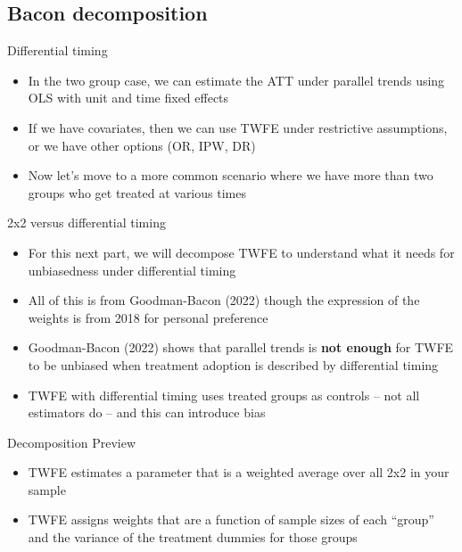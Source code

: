 \documentclass{beamer}
\begin{document}
\subsection{Bacon decomposition}






\begin{frame}{Differential timing}

\begin{itemize}
\item In the two group case, we can estimate the ATT under parallel trends using OLS with unit and time fixed effects
\item If we have covariates, then we can use TWFE under restrictive assumptions, or we have other options (OR, IPW, DR)
\item Now let's move to a more common scenario where we have more than two groups who get treated at various times
\end{itemize}

\end{frame}

\begin{frame}{2x2 versus differential timing}

\begin{itemize}
	\item For this next part, we will decompose TWFE to understand what it needs for unbiasedness under differential timing
	\item All of this is from Goodman-Bacon (2022) though the expression of the weights is from 2018 for personal preference
	\item Goodman-Bacon (2022) shows that parallel trends is \textbf{not enough} for TWFE to be unbiased when treatment adoption is described by differential timing
	\item TWFE with differential timing uses treated groups as controls -- not all estimators do -- and this can introduce bias
\end{itemize}

\end{frame}



\begin{frame}{Decomposition Preview}

\begin{itemize}
\item TWFE estimates a parameter that is a weighted average over all 2x2 in your sample
\item TWFE assigns weights that are a function of sample sizes of each ``group'' and the variance of the treatment dummies for those groups
\end{itemize}

\end{frame}
\end{document}
